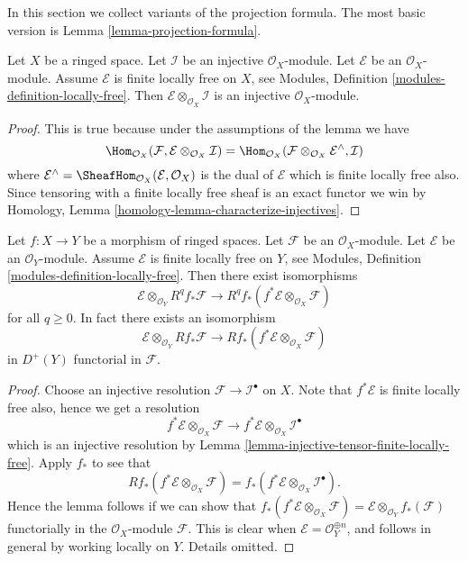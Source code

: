 \noindent
In this section we collect variants of the projection formula.
The most basic version is Lemma \ref{lemma-projection-formula}.

\begin{lemma}
\label{lemma-injective-tensor-finite-locally-free}
Let $X$ be a ringed space.
Let $\mathcal{I}$ be an injective $\mathcal{O}_X$-module.
Let $\mathcal{E}$ be an $\mathcal{O}_X$-module.
Assume $\mathcal{E}$ is finite locally free on $X$, see
Modules, Definition \ref{modules-definition-locally-free}.
Then $\mathcal{E} \otimes_{\mathcal{O}_X} \mathcal{I}$ is
an injective $\mathcal{O}_X$-module.
\end{lemma}

\begin{proof}
This is true because under the assumptions of the lemma we have
$$
\Hom_{\mathcal{O}_X}(\mathcal{F},
\mathcal{E} \otimes_{\mathcal{O}_X} \mathcal{I})
=
\Hom_{\mathcal{O}_X}(
\mathcal{F} \otimes_{\mathcal{O}_X} \mathcal{E}^\wedge, \mathcal{I})
$$
where
$\mathcal{E}^\wedge = \SheafHom_{\mathcal{O}_X}(\mathcal{E}, \mathcal{O}_X)$
is the dual of $\mathcal{E}$ which is finite locally free also. Since tensoring
with a finite locally free sheaf is an exact functor we win by
Homology, Lemma \ref{homology-lemma-characterize-injectives}.
\end{proof}

\begin{lemma}
\label{lemma-projection-formula}
Let $f : X \to Y$ be a morphism of ringed spaces.
Let $\mathcal{F}$ be an $\mathcal{O}_X$-module.
Let $\mathcal{E}$ be an $\mathcal{O}_Y$-module.
Assume $\mathcal{E}$ is finite locally free on $Y$, see
Modules, Definition \ref{modules-definition-locally-free}.
Then there exist isomorphisms
$$
\mathcal{E} \otimes_{\mathcal{O}_Y} R^qf_*\mathcal{F}
\longrightarrow
R^qf_*(f^*\mathcal{E} \otimes_{\mathcal{O}_X} \mathcal{F})
$$
for all $q \geq 0$. In fact there exists an isomorphism
$$
\mathcal{E} \otimes_{\mathcal{O}_Y} Rf_*\mathcal{F}
\longrightarrow
Rf_*(f^*\mathcal{E} \otimes_{\mathcal{O}_X} \mathcal{F})
$$
in $D^{+}(Y)$ functorial in $\mathcal{F}$.
\end{lemma}

\begin{proof}
Choose an injective resolution $\mathcal{F} \to \mathcal{I}^\bullet$
on $X$. Note that $f^*\mathcal{E}$ is finite locally free also, hence
we get a resolution
$$
f^*\mathcal{E} \otimes_{\mathcal{O}_X} \mathcal{F}
\longrightarrow
f^*\mathcal{E} \otimes_{\mathcal{O}_X} \mathcal{I}^\bullet
$$
which is an injective resolution by
Lemma \ref{lemma-injective-tensor-finite-locally-free}.
Apply $f_*$ to see that
$$
Rf_*(f^*\mathcal{E} \otimes_{\mathcal{O}_X} \mathcal{F})
=
f_*(f^*\mathcal{E} \otimes_{\mathcal{O}_X} \mathcal{I}^\bullet).
$$
Hence the lemma follows if we can show that
$f_*(f^*\mathcal{E} \otimes_{\mathcal{O}_X} \mathcal{F}) =
\mathcal{E} \otimes_{\mathcal{O}_Y} f_*(\mathcal{F})$ functorially
in the $\mathcal{O}_X$-module $\mathcal{F}$. This is clear when
$\mathcal{E} = \mathcal{O}_Y^{\oplus n}$, and follows in general
by working locally on $Y$. Details omitted.
\end{proof}






